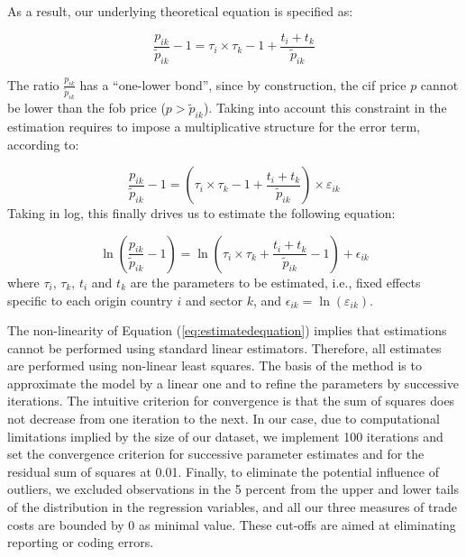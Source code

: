 \documentclass[a4paper,11pt]{article}
\begin{document}
\noindent As a result, our underlying theoretical equation is specified as:

\begin{equation*}
\frac{p_{ik}}{\widetilde{p}_{ik}}-1 =\tau_{i} \times \tau_{k} -1 +\frac{t_{i} + t_{k}}{ \widetilde{p}_{ik}} \label{eq:theory_equation}
\end{equation*}

The ratio $\frac{p_{ik}}{\widetilde{p}_{ik}}$ has a ``one-lower bond'', since by construction, the cif price $p$ cannot be lower than the fob price ($p>\widetilde{p}_{ik}$). Taking into account this constraint in the estimation requires to impose a multiplicative structure for the error term, according to:

\begin{equation*}
\frac{p_{ik}}{\widetilde{p}_{ik}}-1 =\left(\tau_{i} \times \tau_{k} -1+\frac{t_{i} + t_{k}}{\widetilde{p}_{ik}} \right)\times \varepsilon_{ik}
\end{equation*}
\noindent Taking in log, this finally drives us to estimate the following equation:

\begin{equation}
\ln\left(\frac{p_{ik}}{\widetilde{p}_{ik}}-1 \right)= \ln \left(\tau_{i} \times \tau_{k}+\frac{t_{i} + t_{k}}{\widetilde{p}_{ik}}-1 \right) + \epsilon_{ik} \label{eq:estimatedequation}
\end{equation}
where $\tau_{i}$, $\tau_{k}$, $t_{i}$ and $t_{k}$ are the parameters to be estimated, i.e., fixed effects specific to each origin country $i$ and sector $k$, and $\epsilon_{ik}= \ln(\varepsilon_{ik})$.


The non-linearity of Equation (\ref{eq:estimatedequation}) implies that estimations cannot be performed using standard linear estimators. Therefore, all estimates are performed using non-linear least squares. The basis of the method is to approximate the model by a linear one and to refine the parameters by successive iterations. The intuitive criterion for convergence is that the sum of squares does not decrease from one iteration to the next. In our case, due to computational limitations implied by the size of our dataset, we implement 100 iterations and set the convergence criterion for successive parameter estimates and for the residual sum of squares at 0.01. Finally, to eliminate the potential influence of outliers, we excluded observations in the 5 percent from the upper and lower tails of the distribution in the regression variables, and all our three measures of trade costs are bounded by 0 as minimal value. These cut-offs are aimed at eliminating reporting or coding errors.\medskip
\end{document}
